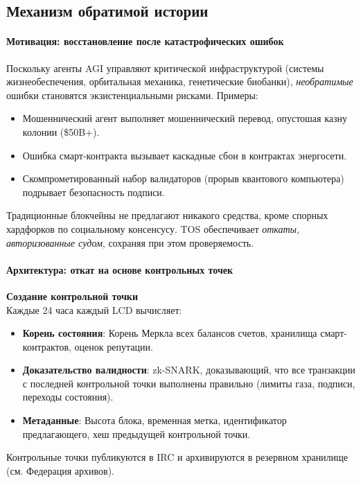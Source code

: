 \documentclass[11pt]{article}
\begin{document}
\subsection{Механизм обратимой истории}

\paragraph{Мотивация: восстановление после катастрофических ошибок}
Поскольку агенты AGI управляют критической инфраструктурой (системы жизнеобеспечения, орбитальная механика, генетические биобанки), \emph{необратимые} ошибки становятся экзистенциальными рисками. Примеры:
\begin{itemize}[noitemsep]
  \item Мошеннический агент выполняет мошеннический перевод, опустошая казну колонии (\$50B+).
  \item Ошибка смарт-контракта вызывает каскадные сбои в контрактах энергосети.
  \item Скомпрометированный набор валидаторов (прорыв квантового компьютера) подрывает безопасность подписи.
\end{itemize}
Традиционные блокчейны не предлагают никакого средства, кроме спорных хардфорков по социальному консенсусу. TOS обеспечивает \emph{откаты, авторизованные судом}, сохраняя при этом проверяемость.

\paragraph{Архитектура: откат на основе контрольных точек}
\textbf{Создание контрольной точки}\\
Каждые 24 часа каждый LCD вычисляет:
\begin{itemize}[noitemsep]
  \item \textbf{Корень состояния}: Корень Меркла всех балансов счетов, хранилища смарт-контрактов, оценок репутации.
  \item \textbf{Доказательство валидности}: zk-SNARK, доказывающий, что все транзакции с последней контрольной точки выполнены правильно (лимиты газа, подписи, переходы состояния).
  \item \textbf{Метаданные}: Высота блока, временная метка, идентификатор предлагающего, хеш предыдущей контрольной точки.
\end{itemize}
Контрольные точки публикуются в IRC и архивируются в резервном хранилище (см. Федерация архивов).
\end{document}
